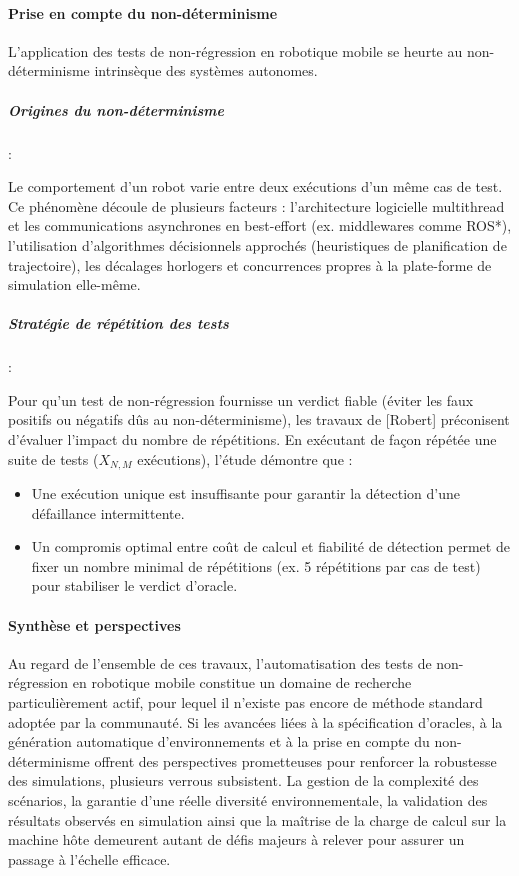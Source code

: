 \paragraph{Prise en compte du non-déterminisme}

L'application des tests de non-régression en robotique mobile se heurte au non-déterminisme intrinsèque des systèmes autonomes.

\subparagraph{Origines du non-déterminisme}:

Le comportement d'un robot varie entre deux exécutions d'un même cas de test. Ce phénomène découle de plusieurs facteurs : l'architecture logicielle multithread et les communications asynchrones en best-effort (ex. middlewares comme ROS*), l'utilisation d'algorithmes décisionnels approchés (heuristiques de planification de trajectoire), les décalages horlogers et concurrences propres à la plate-forme de simulation elle-même.

\subparagraph{Stratégie de répétition des tests}:

Pour qu'un test de non-régression fournisse un verdict fiable (éviter les faux positifs ou négatifs dûs au non-déterminisme), les travaux de [Robert] préconisent d'évaluer l'impact du nombre de répétitions. En exécutant de façon répétée une suite de tests ($X_{N,M}$ exécutions), l'étude démontre que :  \\

\begin{itemize}
    \item Une exécution unique est insuffisante pour garantir la détection d'une défaillance intermittente.  
    \item Un compromis optimal entre coût de calcul et fiabilité de détection permet de fixer un nombre minimal de répétitions (ex. 5 répétitions par cas de test) pour stabiliser le verdict d'oracle.  
\end{itemize}


\paragraph{Synthèse et perspectives} 

Au regard de l'ensemble de ces travaux, l'automatisation des tests de non-régression en robotique mobile constitue un domaine de recherche particulièrement actif, pour lequel il n'existe pas encore de méthode standard adoptée par la communauté. Si les avancées liées à la spécification d'oracles, à la génération automatique d'environnements et à la prise en compte du non-déterminisme offrent des perspectives prometteuses pour renforcer la robustesse des simulations, plusieurs verrous subsistent. La gestion de la complexité des scénarios, la garantie d'une réelle diversité environnementale, la validation des résultats observés en simulation ainsi que la maîtrise de la charge de calcul sur la machine hôte demeurent autant de défis majeurs à relever pour assurer un passage à l'échelle efficace.\\

